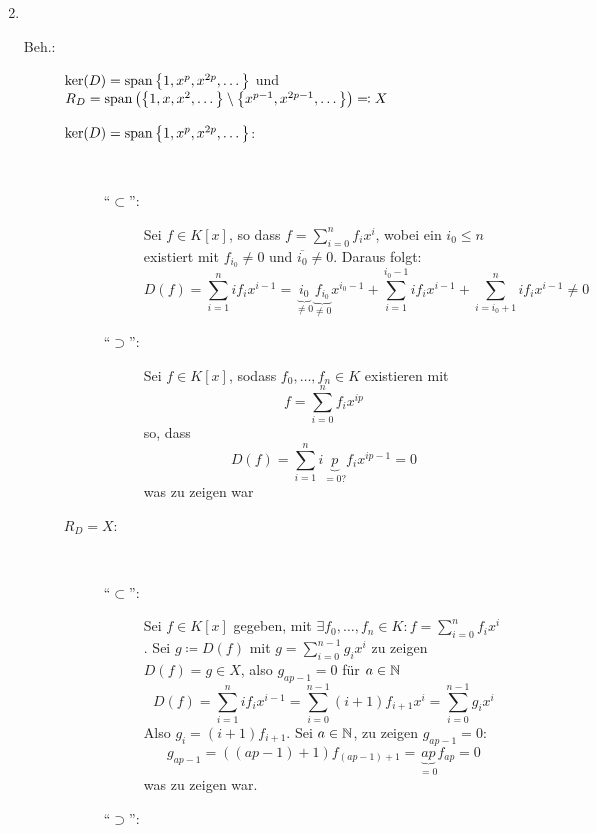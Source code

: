 \documentclass[sectionformat = aufgabe]{gadsescript}
\begin{document}
\begin{enumerate}[label=(\alph*)]
\begin{description}
\begin{description}
\begin{description}
\[								\]
						\end{description}
				\end{description}
		\end{description}
	\item ~
		\begin{description}
			\item[Beh.:] $ \operatorname{ker}(D) = \operatorname{span} \left\{ 1, x^p, x^{2p} , \dotsc \right\}  $ und $ R_D = \operatorname{span} \left( \left\{ 1, x , x^2, \dotsc \right\} \setminus \left\{ x^{p - 1} , x^{2p - 1} , \dotsc \right\}  \right) \eqcolon X $
				\begin{description}
					\item[$ \operatorname{ker} (D) = \operatorname{span} \left\{ 1, x^p, x^{2p} , \dotsc \right\}  $:] ~
						\begin{description}
							\item[``$ \subset $'':] 
								Sei $ f \in K[x] $, so dass $ f = \sum_{i=0}^{n} f_i x^{i}  $, wobei ein $ i_0 \leq n $ existiert mit $ f_{i_0} \neq 0 $ und $ \overline{i_0} \neq 0 $.
								Daraus folgt:
								\[
									D(f) = \sum_{i=1}^{n} i f_{i} x^{i - 1} = \underbrace{i_0}_{\neq 0} \underbrace{f_{i_0}}_{\neq 0} x^{i_0 - 1} + \sum_{i=1}^{i_0 - 1} i f_i x^{i - 1} + \sum_{i=i_0 + 1}^{n} i f_i x^{i - 1} \neq 0
								\]
							\item[``$ \supset $'':] 
								Sei $ f \in K[x] $, sodass $ f_0, \dotsc, f_{n}  \in K $ existieren mit
								\[
									f = \sum_{i=0}^{n} f_{i} x^{ip} 
								\]
								so, dass
								\[
									D(f) = \sum_{i=1}^{n} i \underbrace{p}_{= 0?} f_i x^{ip - 1} = 0
								\]
								was zu zeigen war
						\end{description}
					\item[$ R_D = X $:] ~
						\begin{description}
							\item[``$ \subset $'':]
								Sei $ f \in K[x] $ gegeben, mit $ \exists f_0, \dotsc, f_n \in K : f = \sum_{i=0}^{n} f_i x^i $. Sei $ g \coloneqq D(f) $ mit $ g = \sum_{i=0}^{n - 1} g_i x^i $ zu zeigen $ D(f) = g \in X $, also $ g_{ap - 1} = 0 $ für $ a \in \mathbb{N} $
								\[
									D(f) = \sum_{i=1}^{n} i f_i x^{i - 1} = \sum_{i=0}^{n - 1} ( i + 1 ) f_{i + 1} x^i = \sum_{i=0}^{n - 1} g_i x^i
								\]
								Also $ g_i = ( i + 1 ) f_{i + 1}  $.
								Sei $ a \in \mathbb{N} $, zu zeigen $ g_{ap - 1} = 0 $:
								\[
									g_{ap - 1} = ( (ap - 1) + 1 ) f_{(ap - 1) + 1} = \underbrace{ap}_{= 0} f_{ap} = 0
								\]
								was zu zeigen war.
							\item[``$ \supset $'':] 

\end{description}
\end{description}
\end{description}
\end{enumerate}
\end{document}
